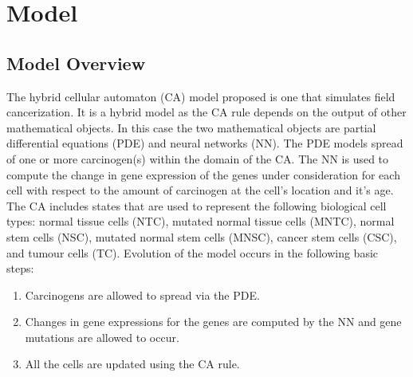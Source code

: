 \documentclass[\main/thesis.tex]{subfiles}
\begin{document}
\chapter{Model}

\section{Model Overview}
The hybrid cellular automaton (CA) model proposed is one that simulates field cancerization. It is a hybrid model as the CA rule depends on the output of other mathematical objects.
In this case the two mathematical objects are partial differential equations (PDE) and neural networks (NN). The PDE models spread of one or more carcinogen(s) within the domain of the CA.
The NN is used to compute the change in gene expression of the genes under consideration for each cell with respect to the amount of carcinogen at the cell's location and it's age. 
The CA includes states that are used to represent the following biological cell types: normal tissue cells (NTC), mutated normal tissue cells (MNTC), normal stem cells (NSC), mutated normal stem cells (MNSC), 
cancer stem cells (CSC), and tumour cells (TC).
Evolution of the model occurs in the following basic steps:
\begin{enumerate}
	\item Carcinogens are allowed to spread via the PDE.
	\item Changes in gene expressions for the genes are computed by the NN and gene mutations are allowed to occur. 
	\item All the cells are updated using the CA rule. 
\end{enumerate}
\end{document}
